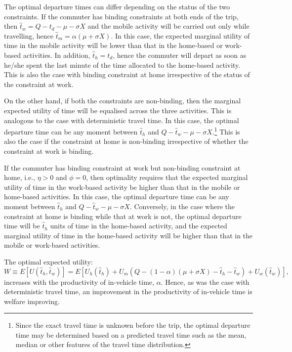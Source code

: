 \documentclass[12pt,a4paper,british]{article}
\begin{document}
The optimal departure times can differ depending on the status of the two constraints. If the commuter has binding constraints at both ends of the trip, then $\hat{t}_{w}=Q-t_{d}-\mu-\sigma X$ and the mobile activity will be carried out only while travelling, hence $\hat{t}_{m}=\alpha\left(\mu+\sigma X\right)$. In this case, the expected marginal utility of time in the mobile activity will be lower than that in the home-based or work-based activities. In addition, $\hat{t}_{h}=t_{d}$, hence the commuter will depart as soon as he/she spent the last minute of the time allocated to the home-based activity. This is also the case with binding constraint at home irrespective of the status of the constraint at work.

On the other hand, if both the constraints are non-binding, then the marginal expected utility of time will be equalised across the three activities. This is analogous to the case with deterministic travel time. In this case, the optimal departure time can be any moment between $\hat{t}_{h}$ and $Q-\hat{t}_{w}-\mu-\sigma X$.\footnote{Since the exact travel time is unknown before the trip, the optimal departure time may be determined based on a predicted travel time such as the mean, median or other features of the travel time distribution.} This is also the case if the constraint at home is non-binding irrespective of whether the constraint at work is binding. 

If the commuter has binding constraint at work but non-binding constraint at home, i.e., $\eta>0$ and $\phi=0$, then optimality requires that the expected marginal utility of time in the work-based activity be higher than that in the mobile or home-based activities. In this case, the optimal departure time can be any moment between $\hat{t}_{h}$ and $Q-\hat{t}_{w}-\mu-\sigma X$. Conversely, in the case where the constraint at home is binding while that at work is not, the optimal departure time will be $\hat{t}_{h}$ units of time in the home-based activity, and the expected marginal utility of time in the home-based activity will be higher than that in the mobile or work-based activities.

The optimal expected utility: 
\begin{equation*}
W\equiv E\left[U\left(\hat{t}_{h},\hat{t}_{w}\right)\right]=E\left[U_{h}\left(\hat{t}_{h}\right)+U_{m}\left(Q-\left(1-\alpha\right)\left(\mu+\sigma X\right)-\hat{t}_{h}-\hat{t}_{w}\right)+U_{w}\left(\hat{t}_{w}\right)\right],
\end{equation*}
increases with the productivity of in-vehicle time, $\alpha$. Hence, as was the case with deterministic travel time, an improvement in the productivity of in-vehicle time is welfare improving.
\end{document}
